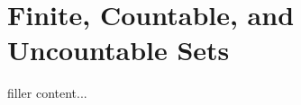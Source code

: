 \documentclass[../../templates/section]{subfiles}
\begin{document}
\section{Finite, Countable, and Uncountable Sets}\label{sec:finite-countable-and-uncountable-sets}

filler content...
\end{document}
